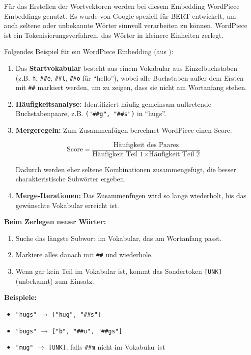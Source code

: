 Für das Erstellen der Wortvektoren werden bei diesem Embedding WordPiece Embeddings genutzt.
Es wurde von Google speziell für BERT entwickelt, um auch seltene oder unbekannte Wörter sinnvoll verarbeiten zu können.
WordPiece ist ein Tokenisierungsverfahren, das Wörter in kleinere Einheiten zerlegt.

Folgendes Beispiel für ein WordPiece Embedding (aus \cite{huggingface2025wordpiece}):
\begin{enumerate}
    \item Das \textbf{Startvokabular} besteht aus einem Vokabular aus Einzelbuchstaben 
    (z.B. \texttt{h}, \texttt{\#\#e}, \texttt{\#\#l}, \texttt{\#\#o} für ``hello''), 
    wobei alle Buchstaben außer dem Ersten mit \texttt{\#\#} markiert werden, um zu zeigen, dass sie nicht am Wortanfang stehen.

    \item \textbf{Häufigkeitsanalyse:} Identifiziert häufig gemeinsam auftretende Buchstabenpaare, 
    z.B. \texttt{("\#\#g", "\#\#s")} in ``hugs''.

    \item \textbf{Mergeregeln:} Zum Zusammenfügen berechnet WordPiece einen Score:

    \begin{equation}
        \text{Score} = \frac{\text{Häufigkeit des Paares}}{\text{Häufigkeit Teil 1} \times \text{Häufigkeit Teil 2}}
    \end{equation}

    Dadurch werden eher seltene Kombinationen zusammengefügt, die besser charakteristische Subwörter ergeben.

    \item \textbf{Merge-Iterationen:} Das Zusammenfügen wird so lange wiederholt, bis das gewünschte Vokabular erreicht ist.
\end{enumerate}

\textbf{Beim Zerlegen neuer Wörter:}
\begin{enumerate}
    \item Suche das längste Subwort im Vokabular, das am Wortanfang passt.
    \item Markiere alles danach mit \texttt{\#\#} und wiederhole.
    \item Wenn gar kein Teil im Vokabular ist, kommt das Sondertoken \texttt{[UNK]} (unbekannt) zum Einsatz.
\end{enumerate}

\textbf{Beispiele:}
\begin{itemize}
    \item \texttt{"hugs"} $\rightarrow$ \texttt{["hug", "\#\#s"]}
    \item \texttt{"bugs"} $\rightarrow$ \texttt{["b", "\#\#u", "\#\#gs"]}
    \item \texttt{"mug"} $\rightarrow$ \texttt{[UNK]}, falls \texttt{\#\#m} nicht im Vokabular ist
\end{itemize}

